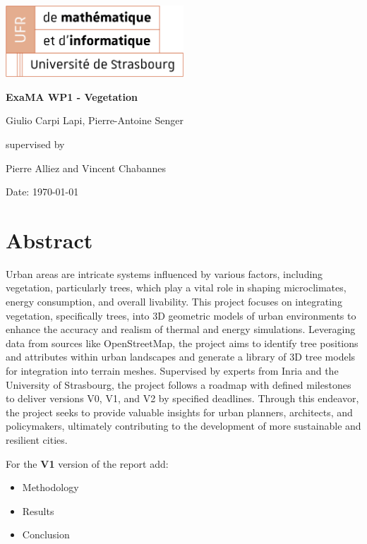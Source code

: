 \documentclass[12pt]{article}
\begin{document}
\begin{titlepage}
    \centering
    \includegraphics[width=0.5\textwidth]{images/logo_ufr.png}\par\vspace{1cm}
    \vspace{1.5cm}
    {\huge\bfseries ExaMA WP1 - Vegetation\par}
    \vspace{2cm}
    {\Large Giulio Carpi Lapi, Pierre-Antoine Senger\par}
    \vfill
    supervised by\par
    Pierre Alliez and Vincent Chabannes

    \vfill

    {\large Date: \today\par}
\end{titlepage}

\tableofcontents
\newpage

\section{Abstract}
Urban areas are intricate systems influenced by various factors,
including vegetation, particularly trees, which play a vital role in shaping
microclimates, energy consumption, and overall livability. This project focuses
on integrating vegetation, specifically trees, into 3D geometric models of
urban environments to enhance the accuracy and realism of thermal and energy
simulations. Leveraging data from sources like OpenStreetMap, the project aims
to identify tree positions and attributes within urban landscapes and generate
a library of 3D tree models for integration into terrain meshes. Supervised by
experts from Inria and the University of Strasbourg, the project follows a
roadmap with defined milestones to deliver versions V0, V1, and V2 by specified
deadlines. Through this endeavor, the project seeks to provide valuable
insights for urban planners, architects, and policymakers, ultimately
contributing to the development of more sustainable and resilient cities.

For the \textbf{V1} version of the report add:

\begin{itemize}
    \item Methodology
    \item Results
    \item Conclusion
\end{itemize}
\end{document}

